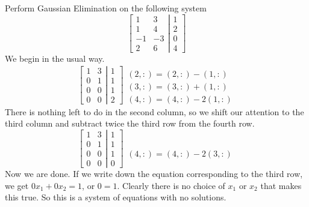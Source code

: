 \begin{example} Perform Gaussian Elimination on the following system
\[
\left[
\begin{array}{cc}
1&3 \\
1&4 \\
-1&-3\\
2&6 
\end{array} \right| \left.
\begin{array}{c}
1 \\ 2 \\ 0 \\ 4 
\end{array}
\right]
\]
{ \rm We begin in the usual way.
\[
\left[
\begin{array}{cc}
1&3 \\
0&1 \\
0&0\\
0&0 
\end{array} \right| \left.
\begin{array}{c}
1 \\ 1 \\ 1 \\ 2 
\end{array}
\right]
\begin{array}{c} 
 \\ (2,:)=(2,:)-(1,:) \\ (3,:)=(3,:)+(1,:) \\ (4,:)=(4,:)-2(1,:)
\end{array}
\]
There is nothing left to do in the second column,
so we shift our attention to the third column and subtract twice the third row
from the fourth row.
\[
\left[
\begin{array}{cc}
1&3 \\
0&1 \\
0&0\\
0&0
\end{array} \right| \left.
\begin{array}{c}
1 \\ 1 \\ 1 \\ 0
\end{array}
\right]
\begin{array}{c}
 \\ \\ \\ (4,:)=(4,:)-2(3,:)
\end{array}
\]
Now we are done. If we write
down the equation corresponding to the third row, we get
$0x_1+0x_2=1$, or $0=1$. Clearly there is no choice of $x_1$ or $x_2$ that
makes this true. So this is a system
of equations with no solutions.}
\end{example}

